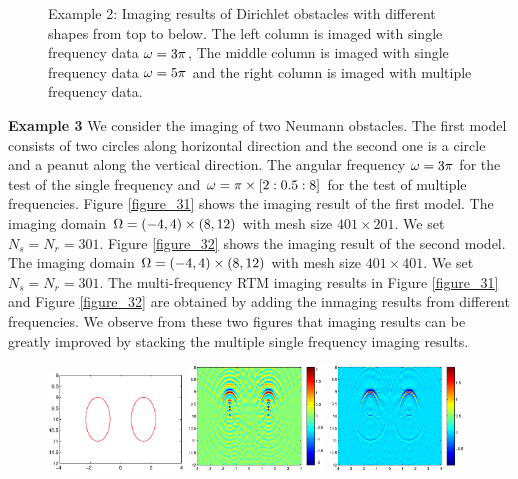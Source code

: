 \documentclass[12pt]{iopart}
\begin{document}
{\begin{figure}
	\caption{Example 2: Imaging results of Dirichlet obstacles
		with different shapes from top to below. The left column is imaged with single frequency data $\omega=3\pi$, The middle column is imaged with single frequency data $\omega=5\pi$ and the right column is imaged with multiple frequency data.}\label{figure_2}
\end{figure}

\bigskip
\textbf{Example 3} We consider the imaging of two Neumann obstacles. The first model
consists of two circles along horizontal direction and the second one is a circle and a
peanut along the vertical direction. The angular frequency $\omega=3\pi$ for the test of the single frequency and $\omega=\pi\times[2:0.5:8]$ for the test of multiple frequencies. Figure \ref{figure_31} shows the imaging result of the first model. The
imaging domain $\Omega=(-4, 4) \times (8,12)$ with mesh size $401 \times 201$. We set $N_s = N_r = 301$. Figure \ref{figure_32}
 shows the imaging result of the second model. The
 imaging domain $\Omega=(-4, 4)\times (8,12)$ with mesh size $401 \times 401$. We set $N_s = N_r = 301$. The multi-frequency RTM imaging results in Figure \ref{figure_31} and Figure \ref{figure_32} are obtained by adding the inmaging results from different frequencies. We observe from these two figures that imaging results can be greatly improved by stacking the multiple single frequency imaging results. 
\begin{figure}
	\centering
	\includegraphics[width=0.32\textwidth,height=0.16\textheight]{./graphic/bi_circle_profile.eps}
	\includegraphics[width=0.32\textwidth]{./graphic/bi_circle_3pi.eps}
	\includegraphics[width=0.32\textwidth]{./graphic/bi_circle.eps}
	

\end{figure}}
\end{document}

